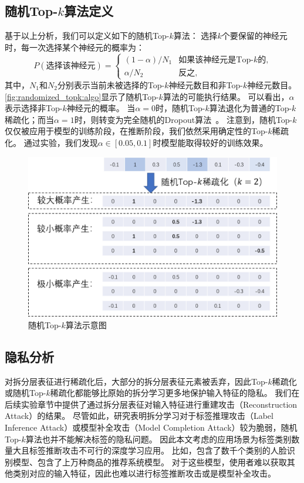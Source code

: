 \subsection{随机Top-$k$算法定义}
基于以上分析，我们可以定义如下的随机Top-$k$算法：
%
选择$k$个要保留的神经元时，每一次选择某个神经元的概率为：
\begin{equation}
\label{eq:randomized_topk:def}
    P(\text{选择该神经元}) = 
    \begin{cases}
        (1 - \alpha) / N_1  & \text{如果该神经元是Top-$k$的,} \\
        \alpha / N_2        & \text{反之,}    
    \end{cases}
\end{equation}
%
其中，$N_1$和$N_2$分别表示当前未被选择的Top-$k$神经元数目和非Top-$k$神经元数目。
%
\autoref{fig:randomized_topk:algo}显示了随机Top-$k$算法的可能执行结果。
%
可以看出，$\alpha$表示选择非Top-$k$神经元的概率。
%
当$\alpha=0$时，随机Top-$k$算法退化为普通的Top-$k$稀疏化；而当$\alpha=1$时，则转变为完全随机的Dropout算法~\cite{srivastava_2014_dropout}。
%
注意到，随机Top-$k$仅仅被应用于模型的训练阶段，在推断阶段，我们依然采用确定性的Top-$k$稀疏化。
%
通过实验，我们发现$\alpha \in [0.05, 0.1]$时模型能取得较好的训练效果。
%
\begin{figure}[h!]
    \centering
    \includegraphics[width=0.7\linewidth]{Z_Resources/randtopk_algorithm.png}
    \caption{随机Top-$k$算法示意图}
    \label{fig:randomized_topk:algo}
\end{figure}


\subsection{隐私分析}
对拆分层表征进行稀疏化后，大部分的拆分层表征元素被丢弃，因此Top-$k$稀疏化或随机Top-$k$稀疏化都能够比原始的拆分学习更多地保护输入特征的隐私。
%
我们在后续实验章节中提供了通过拆分层表征对输入特征进行重建攻击（Reconstruction Attack）的结果。
%
尽管如此，研究表明拆分学习对于标签推理攻击（Label Inference Attack）或模型补全攻击（Model Completion Attack）较为脆弱\cite{fucong2022label_infer_attack}，随机Top-$k$算法也并不能解决标签的隐私问题。
%
因此本文考虑的应用场景为标签类别数量大且标签推断攻击不可行的深度学习应用。
%
比如，包含了数千个类别的人脸识别模型、包含了上万种商品的推荐系统模型。
%
对于这些模型，使用者难以获取其他类别对应的输入特征，因此也难以进行标签推断攻击或是模型补全攻击。
%

